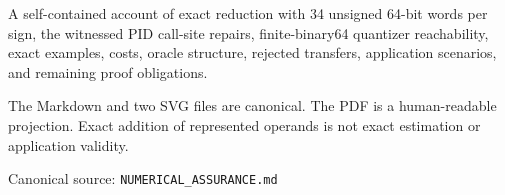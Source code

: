 {\begin{titlepage}
\begin{minipage}{0.86\textwidth}
      \large
      A self-contained account of exact reduction with 34 unsigned 64-bit words per sign, the witnessed PID
      call-site repairs, finite-binary64 quantizer reachability, exact examples, costs, oracle
      structure, rejected transfers, application scenarios, and remaining proof obligations.
    \end{minipage}\par
    \vfill
    \begin{minipage}{0.88\textwidth}
      \small\color{PidSlate}
      The Markdown and two SVG files are canonical. The PDF is a human-readable projection.
      Exact addition of represented operands is not exact estimation or application validity.
    \end{minipage}\par
    \vspace{12mm}
    {\large\color{PidInk}\@author\par}
    \vspace{3mm}
    {\large\color{PidInk}\@date\par}
    \vspace{3mm}
    {\small\color{PidSlate}Canonical source: \texttt{NUMERICAL\_ASSURANCE.md}\par}
    \vspace{17mm}
  \end{titlepage}
  \hypersetup{pageanchor=true}%
  \setcounter{page}{1}%
  \pagecolor{PidIvory}\color{PidInk}
}
\makeatother
